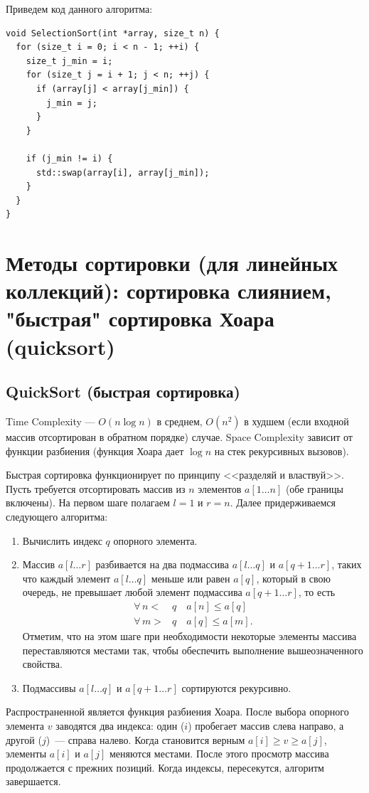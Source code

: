 Приведем код данного алгоритма:
\begin{verbatim}
void SelectionSort(int *array, size_t n) {
  for (size_t i = 0; i < n - 1; ++i) {
    size_t j_min = i;
    for (size_t j = i + 1; j < n; ++j) {
      if (array[j] < array[j_min]) {
        j_min = j;
      }
    }

    if (j_min != i) {
      std::swap(array[i], array[j_min]);
    }
  }
}  
\end{verbatim}

\section{Методы сортировки (для линейных коллекций): сортировка слиянием, "быстрая" сортировка Хоара (quicksort)}
\subsection{QuickSort (быстрая сортировка)}
Time Complexity --- $O(n\log n)$ в среднем, $O(n^2)$
в худшем (если входной массив отсортирован в обратном порядке) случае.
Space Complexity зависит от функции разбиения (функция Хоара дает $\log n$ на стек рекурсивных вызовов).

Быстрая сортировка функционирует по принципу <<разделяй и властвуй>>.
Пусть требуется отсортировать массив из $n$ элементов $a[1\dots n]$ (обе границы включены).
На первом шаге полагаем $l=1$ и $r=n$. Далее придерживаемся следующего алгоритма:
\begin{enumerate}
  \item Вычислить индекс $q$ опорного элемента.
  \item Массив $a[l\dots r]$
  разбивается на два подмассива $a[l\dots q]$ и $a[q+1\dots r]$, таких что каждый элемент $a[l\dots q]$
  меньше или равен $a[q]$, который в свою очередь, не превышает любой элемент подмассива $a[q+1\dots r]$, то есть
  \begin{align*}
    \forall\, n <&q \quad a[n] \leq a[q] \\
    \forall\, m >&q \quad a[q] \leq a[m].
  \end{align*}
  Отметим, что на этом шаге при необходимости некоторые элементы массива переставляются местами так,
  чтобы обеспечить выполнение вышеозначенного свойства.
  \item Подмассивы $a[l\dots q]$ и $a[q+1\dots r]$ сортируются рекурсивно.
\end{enumerate}

Распространенной является функция разбиения Хоара. После выбора опорного элемента $v$
заводятся два индекса: один ($i$) пробегает массив слева направо, а другой ($j$)~--- справа налево.
Когда становится верным $a[i] \geq v \geq a[j]$, элементы $a[i]$ и $a[j]$
меняются местами. После этого просмотр массива продолжается с прежних позиций. Когда индексы,
пересекутся, алгоритм завершается.

